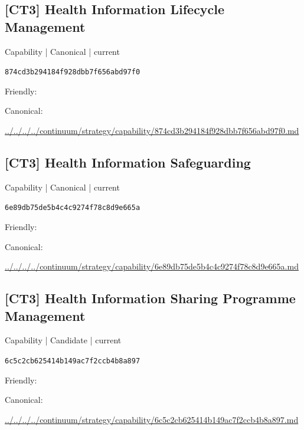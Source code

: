 \documentclass[10pt,a4paper]{article}
\begin{document}
\subsection*{[CT3] Health Information Lifecycle Management}
{\small Capability | Canonical | current}\par
\texttt{874cd3b294184f928dbb7f656abd97f0}\par
Friendly: \par
Canonical: \par
{\footnotesize\url{../../../../continuum/strategy/capability/874cd3b294184f928dbb7f656abd97f0.md}}\par
\subsection*{[CT3] Health Information Safeguarding}
{\small Capability | Canonical | current}\par
\texttt{6e89db75de5b4c4c9274f78c8d9e665a}\par
Friendly: \par
Canonical: \par
{\footnotesize\url{../../../../continuum/strategy/capability/6e89db75de5b4c4c9274f78c8d9e665a.md}}\par
\subsection*{[CT3] Health Information Sharing Programme Management}
{\small Capability | Candidate | current}\par
\texttt{6c5c2cb625414b149ac7f2ccb4b8a897}\par
Friendly: \par
Canonical: \par
{\footnotesize\url{../../../../continuum/strategy/capability/6c5c2cb625414b149ac7f2ccb4b8a897.md}}\par
\end{document}
